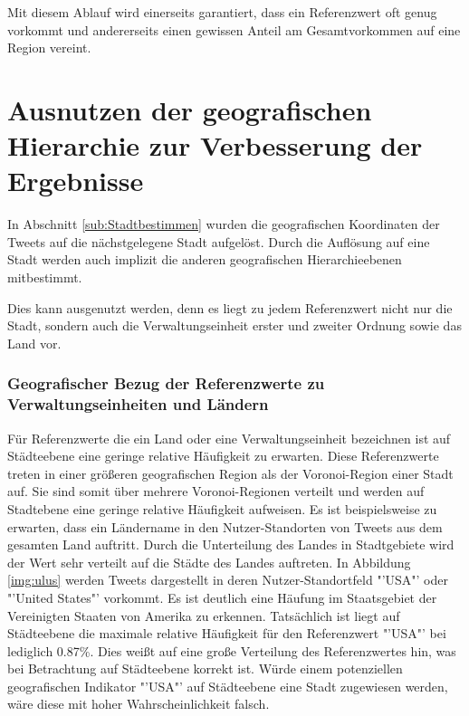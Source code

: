 				Mit diesem Ablauf wird einerseits garantiert, dass ein Referenzwert oft genug vorkommt und andererseits einen gewissen Anteil am Gesamtvorkommen auf eine Region vereint.

	\section{Ausnutzen der geografischen Hierarchie zur Verbesserung der Ergebnisse} \label{sec:ausnutzenDerGeografischenHierarchie}

		In Abschnitt \ref{sub:Stadtbestimmen} wurden die geografischen Koordinaten der Tweets auf die nächstgelegene Stadt aufgelöst. 
		Durch die Auflösung auf eine Stadt werden auch implizit die anderen geografischen Hierarchieebenen mitbestimmt. 
		
		Dies kann ausgenutzt werden, denn es liegt zu jedem Referenzwert nicht nur die Stadt, sondern auch die Verwaltungseinheit erster und zweiter Ordnung sowie das Land vor.

		\subsubsection{Geografischer Bezug der Referenzwerte zu Verwaltungseinheiten und Ländern} 

			Für Referenzwerte die ein Land oder eine Verwaltungseinheit bezeichnen ist auf Städteebene eine geringe relative Häufigkeit zu erwarten.
			Diese Referenzwerte treten in einer größeren geografischen Region als der Voronoi-Region einer Stadt auf.
			Sie sind somit über mehrere Voronoi-Regionen verteilt und werden auf Stadtebene eine geringe relative Häufigkeit aufweisen.
			Es ist beispielsweise zu erwarten, dass ein Ländername in den Nutzer-Standorten von Tweets aus dem gesamten Land auftritt.
			Durch die Unterteilung des Landes in Stadtgebiete wird der Wert sehr verteilt auf die Städte des Landes auftreten.
			In Abbildung \ref{img:ulus} werden Tweets dargestellt in deren Nutzer-Standortfeld "'USA"' oder "'United States"' vorkommt.
			Es ist deutlich eine Häufung im Staatsgebiet der Vereinigten Staaten von Amerika zu erkennen.
			Tatsächlich ist liegt auf Städteebene die maximale relative Häufigkeit für den Referenzwert "'USA"' bei lediglich 0.87\%.   
			Dies weißt auf eine große Verteilung des Referenzwertes hin, was bei Betrachtung auf Städteebene korrekt ist.
			Würde einem potenziellen geografischen Indikator "'USA"' auf Städteebene eine Stadt zugewiesen werden, wäre diese mit hoher Wahrscheinlichkeit falsch. 


